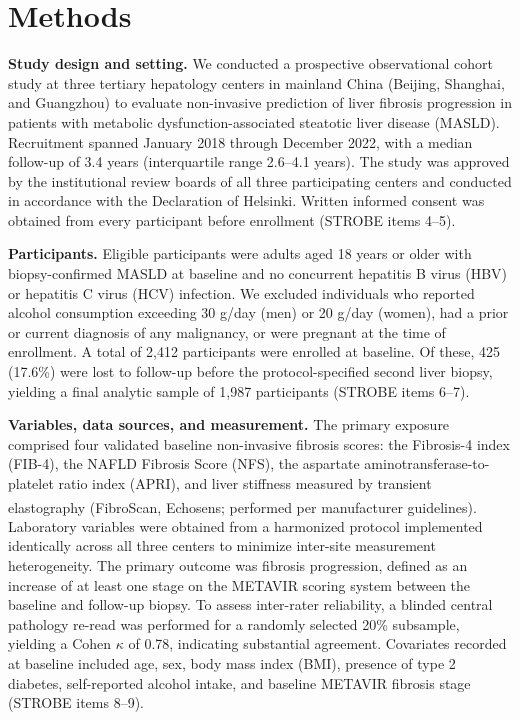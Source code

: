 \documentclass[11pt,letterpaper]{article}
\begin{document}
\section*{Methods}

\textbf{Study design and setting.}
We conducted a prospective observational cohort study at three tertiary hepatology centers in mainland China (Beijing, Shanghai, and Guangzhou) to evaluate non-invasive prediction of liver fibrosis progression in patients with metabolic dysfunction-associated steatotic liver disease (MASLD). Recruitment spanned January 2018 through December 2022, with a median follow-up of 3.4 years (interquartile range 2.6--4.1 years). The study was approved by the institutional review boards of all three participating centers and conducted in accordance with the Declaration of Helsinki. Written informed consent was obtained from every participant before enrollment (STROBE items 4--5).

\textbf{Participants.}
Eligible participants were adults aged 18 years or older with biopsy-confirmed MASLD at baseline and no concurrent hepatitis B virus (HBV) or hepatitis C virus (HCV) infection. We excluded individuals who reported alcohol consumption exceeding 30 g/day (men) or 20 g/day (women), had a prior or current diagnosis of any malignancy, or were pregnant at the time of enrollment. A total of 2{,}412 participants were enrolled at baseline. Of these, 425 (17.6\%) were lost to follow-up before the protocol-specified second liver biopsy, yielding a final analytic sample of 1{,}987 participants (STROBE items 6--7).

\textbf{Variables, data sources, and measurement.}
The primary exposure comprised four validated baseline non-invasive fibrosis scores: the Fibrosis-4 index (FIB-4), the NAFLD Fibrosis Score (NFS), the aspartate aminotransferase-to-platelet ratio index (APRI), and liver stiffness measured by transient elastography (FibroScan\textsuperscript{\textregistered}, Echosens; performed per manufacturer guidelines). Laboratory variables were obtained from a harmonized protocol implemented identically across all three centers to minimize inter-site measurement heterogeneity. The primary outcome was fibrosis progression, defined as an increase of at least one stage on the METAVIR scoring system between the baseline and follow-up biopsy. To assess inter-rater reliability, a blinded central pathology re-read was performed for a randomly selected 20\% subsample, yielding a Cohen $\kappa$ of 0.78, indicating substantial agreement. Covariates recorded at baseline included age, sex, body mass index (BMI), presence of type 2 diabetes, self-reported alcohol intake, and baseline METAVIR fibrosis stage (STROBE items 8--9).
\end{document}
